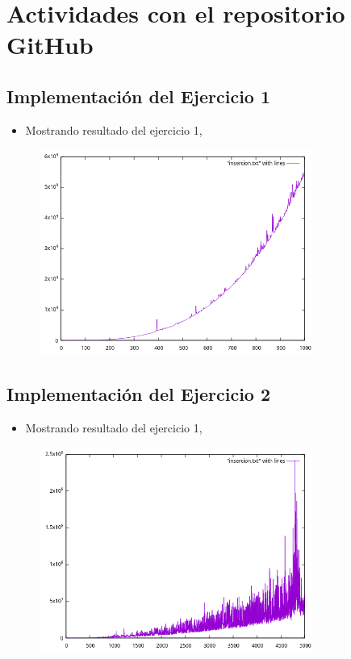 \section{Actividades con el repositorio GitHub}

\subsection{Implementación del Ejercicio 1}

\begin{itemize}
	\item Mostrando resultado del ejercicio 1, 
\end{itemize}
\begin{figure}[H]
		\centering
\includegraphics[width=0.8\textwidth,keepaspectratio]{img/capEjercicio1.png}
	\end{figure}

\subsection{Implementación del Ejercicio 2}
\begin{itemize}
	\item Mostrando resultado del ejercicio 1, 
\end{itemize}
\begin{figure}[H]
		\centering
\includegraphics[width=0.8\textwidth,keepaspectratio]{img/graph.png}
	\end{figure}

